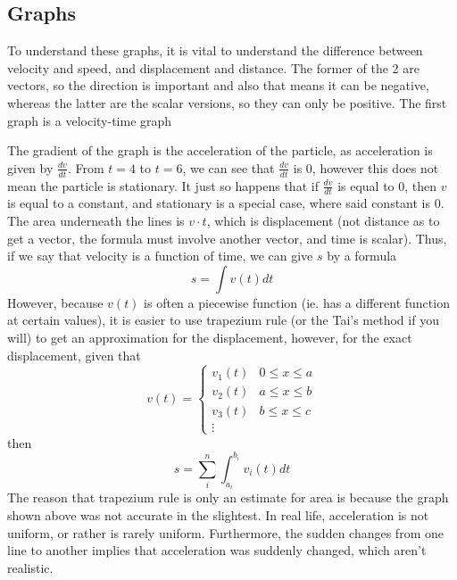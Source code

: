 \documentclass{article}
\begin{document}
\subsection{Graphs}
{To understand these graphs, it is vital to understand the difference between velocity and speed, and displacement and distance. The former of the 2 are vectors, so the direction is important and also that means it can be negative, whereas the latter are the scalar versions, so they can only be positive.}
{The first graph is a velocity-time graph}
\begin{center}
    

\begin{figure}[h]
\end{figure}
\end{center}
{The gradient of the graph is the acceleration of the particle, as acceleration is given by $\frac{dv}{dt}$. From $t=4$ to $t=6$, we can see that $\frac{dv}{dt}$ is 0, however this does not mean the particle is stationary. It just so happens that if $\frac{dv}{dt}$ is equal to 0, then $v$ is equal to a constant, and stationary is a special case, where said constant is 0. \\ The area underneath the lines is $v\cdot t$, which is displacement (not distance as to get a vector, the formula must involve another vector, and time is scalar). Thus, if we say that velocity is a function of time, we can give $s$ by a formula \[s=\int v(t) dt\]However, because $v(t)$ is often a piecewise function (ie. has a different function at certain values), it is easier to use trapezium rule (or the Tai's method if you will) to get an approximation for the displacement, however, for the exact displacement, given that \[v(t)=\begin{cases}v_{1}(t) & 0\leq x \leq a \\v_{2}(t) & a\leq x\leq b \\v_3(t) & b\leq x \leq c \\ \vdots \end{cases}\]then \[s=\sum_{i}^{n} \int^{b_i}_{a_i} v_i(t) dt\] The reason that trapezium rule is only an estimate for area is because the graph shown above was not accurate in the slightest. In real life, acceleration is not uniform, or rather is rarely uniform. Furthermore, the sudden changes from one line to another implies that acceleration was suddenly changed, which aren't realistic. \\}
\end{document}
